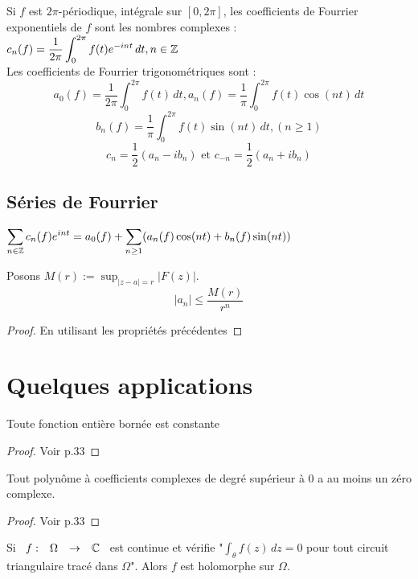 \documentclass[]{report}
\begin{document}
\begin{ra}
    Si $f$ est $2\pi$-périodique, intégrale sur $[0,2\pi]$, les coefficients de Fourrier exponentiels de $f$ sont les nombres complexes : $\displaystyle{c_n(f)=\frac{1}{2\pi}\int_0^{2\pi}f(t)e^{-int}\,dt},n\in \mathbb{Z}$\\
    Les coefficients de Fourrier trigonométriques sont :\\
    $$a_0(f)=\frac{1}{2\pi}\int_0^{2\pi}f(t)\,dt,a_n(f)=\frac{1}{\pi}\int_0^{2\pi}f(t)\cos(nt)\,dt$$
    $$b_n(f)=\frac{1}{\pi}\int_0^{2\pi}f(t)\sin(nt)\,dt,(n\ge1)$$
    $$c_n=\frac12(a_n-ib_n)\text{ et }c_{-n}=\frac12(a_n+ib_n)$$
\end{ra}

\subsection*{Séries de Fourrier}

$\displaystyle{\sum_{n\in\mathbb{Z}}c_n(f)e^{int}=a_0(f)+\sum_{n\ge 1}(a_n(f)\cos(nt)+b_n(f)\sin(nt))}$

\begin{prop} 
Posons $\displaystyle{M(r):=\sup_{|z-a|=r}|F(z)|}$.
    $$|a_n|\le \frac{M(r)}{r^n}$$
\end{prop}

\begin{proof}
    En utilisant les propriétés précédentes
\end{proof}

\section{Quelques applications}

\begin{tm}
    Toute fonction entière bornée est constante
\end{tm}

\begin{proof}
    Voir p.33
\end{proof}

\begin{cor}
    Tout polynôme à coefficients complexes de degré supérieur à 0 a au moins un zéro complexe.
\end{cor}

\begin{proof}
    Voir p.33
\end{proof}

\begin{tm}
    Si $\begin{array}{ccccc} f : & \Omega & \to & \mathbb{C} \end{array}$ est continue et vérifie "$\int_\theta f(z)\,dz=0$ pour tout circuit triangulaire tracé dans $\Omega$". Alors $f$ est holomorphe sur $\Omega$.
\end{tm}
\end{document}
